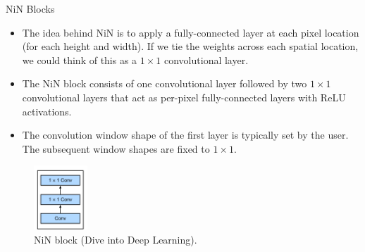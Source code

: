 \begin{vbframe}{NiN Blocks}
  \begin{itemize}
    \item The idea behind NiN is to apply a fully-connected layer at each pixel location (for each height and width). If we tie the weights across each spatial location, we could think of this as a $1 \times 1$ convolutional layer.
    \item The NiN block consists of one convolutional layer followed by two $1 \times 1$  convolutional layers that act as per-pixel fully-connected layers with ReLU activations.
    \item The convolution window shape of the first layer is typically set by the user. The subsequent window shapes are fixed to $1 \times 1$.
  \end{itemize}
  \begin{figure}
  \centering
    \includegraphics[width=2cm]{plots/moderncnn/ninblock.png}
    \caption{NiN block (Dive into Deep Learning).}
  \end{figure}

\end{vbframe}


